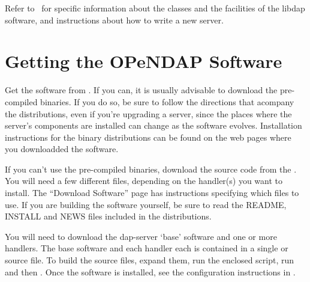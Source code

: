 \documentclass{dods-book}
\begin{document}
Refer to \DODSapi\ for specific information about the classes and the
facilities of the libdap software, and instructions about how to write
a new server.



\appendix
\chapter{Getting the OPeNDAP Software}
\label{install}

Get the software from \DODShome .  If you can, it is usually advisable
to download the pre-compiled binaries.  If you do so, be sure to
follow the directions that acompany the distributions, even if you're
upgrading a server, since the places where the server's components are
installed can change as the software evolves. Installation
instructions for the binary distributions can be found on the web
pages where you downloadded the software.

If you can't use the pre-compiled binaries, download the source code
from the \DODShome . You will need a few different files, depending on
the handler(s) you want to install. The ``Download Software'' page has
instructions specifying which files to use. If you are building the
software yourself, be sure to read the README, INSTALL and NEWS files
included in the distributions.

You will need to download the dap-server `base' software and one or
more handlers. The base software and each handler each is contained in
a single  or source  file. To build the source
files, expand them, run the enclosed  script, run
 and then . Once the software is
installed, see the configuration instructions
in . 



\printindex
\end{document}
